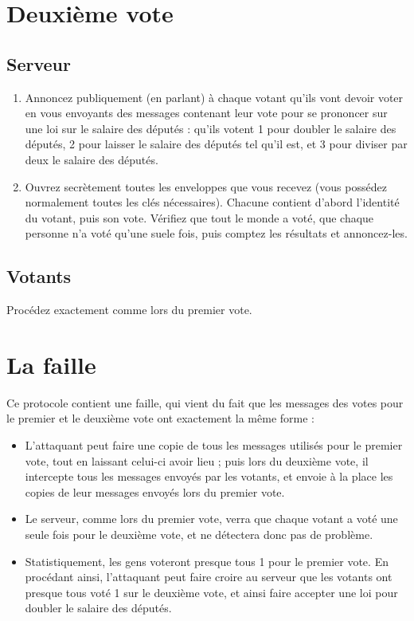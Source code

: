 \documentclass[a4paper,10pt]{article}
\begin{document}
\section{Deuxième vote}
\subsection{Serveur}
	\begin{enumerate}
		\item Annoncez publiquement (en parlant) à chaque votant qu'ils vont devoir voter en vous envoyants des messages contenant leur vote pour se prononcer sur une loi sur le salaire des députés : qu'ils votent 1 pour doubler le salaire des députés, 2 pour laisser le salaire des députés tel qu'il est, et 3 pour diviser par deux le salaire des députés.
		\item Ouvrez secrètement toutes les enveloppes que vous recevez (vous possédez normalement toutes les clés nécessaires). Chacune contient d'abord l'identité du votant, puis son vote. Vérifiez que tout le monde a voté, que chaque personne n'a voté qu'une suele fois, puis comptez les résultats et annoncez-les.
	\end{enumerate}
\subsection{Votants}
	Procédez exactement comme lors du premier vote.

\section{La faille}
Ce protocole contient une faille, qui vient du fait que les messages des votes pour le premier et le deuxième vote ont exactement la même forme :
\begin{itemize}
	\item L'attaquant peut faire une copie de tous les messages utilisés pour le premier vote, tout en laissant celui-ci avoir lieu ; puis lors du deuxième vote, il intercepte tous les messages envoyés par les votants, et envoie à la place les copies de leur messages envoyés lors du premier vote.
	\item Le serveur, comme lors du premier vote, verra que chaque votant a voté une seule fois pour le deuxième vote, et ne détectera donc pas de problème.
	\item Statistiquement, les gens voteront presque tous 1 pour le premier vote. En procédant ainsi, l'attaquant peut faire croire au serveur que les votants ont presque tous voté 1 sur le deuxième vote, et ainsi faire accepter une loi pour doubler le salaire des députés.
\end{itemize}
\end{document}
